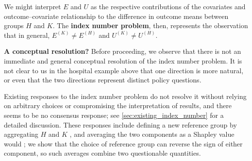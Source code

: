 We might interpret $E$ and $U$ as the respective contributions of the covariates and outcome--covariate relationship to the 
difference in outcome means between groups $H$ and $K$. The \textbf{index number problem}, then, represents the observation
that in general, $E^{(K)} \neq E^{(H)}$ and $U^{(K)} \neq U^{(H)}$.

\textbf{A conceptual resolution?}
Before proceeding, we observe that there is not an immediate and general conceptual resolution of the index number problem.
It is not clear to us in the hospital example above that one direction is more natural, or even that the two directions represent distinct policy questions.

Existing responses to the index number problem do not resolve it without relying on arbitrary choices or compromising the interpretation of results, and there seems to be no consensus response; see \cref{sec:existing_index_number} for a detailed discussion.
These responses include defining a new reference group by aggregating $H$ and $K$ \citep{oaxacaRansom1998,neumark1988}, and averaging the two components as a Shapley value would \citep{Shapley1953}; we show that the choice of reference group can reverse the sign of either component, so such averages combine two questionable quantities.

